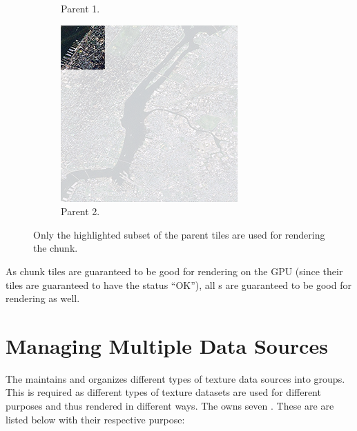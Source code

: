 \begin{figure}[htbp]
\begin{subfigure}[t]{0.3\textwidth}
        \caption{Parent 1.}
    \end{subfigure}
    \quad
    \begin{subfigure}[t]{0.3\textwidth}
        \includegraphics[width=\textwidth]{figures/implementation/chunktile/chunktilepile1.png}
        \caption{Parent 2.}
    \end{subfigure}
    \caption{Only the highlighted subset of the parent tiles are used for rendering the chunk.}
    \label{fig:chunktilepile}
\end{figure}

As chunk tiles are guaranteed to be good for rendering on the GPU (since their tiles are guaranteed to have the status ``OK''), all s are guaranteed to be good for rendering as well. 

\section{Managing Multiple Data Sources}
The  maintains and organizes different types of texture data sources into groups. This is required as different types of texture datasets are used for different purposes and thus rendered in different ways. The  owns seven . These are are listed below with their respective purpose:

